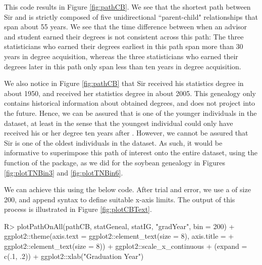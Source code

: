 \documentclass[article,shortnames]{jss}
\begin{document}
This code results in Figure \ref{fig:pathCB}. We see that the shortest path between Sir  and  is strictly composed of five unidirectional ``parent-child" relationships that span about 55 years. We see that the time difference between when an advisor and student earned their degrees is not consistent across this path: The three statisticians who earned their degrees earliest in this path span more than 30 years in degree acquisition, whereas the three statisticians who earned their degrees later in this path only span less than ten years in degree acquisition.

We also notice in Figure \ref{fig:pathCB} that Sir  received his statistics degree in about 1950, and  received her statistics degree in about 2005. This genealogy only contains historical information about obtained degrees, and does not project into the future. Hence, we can be assured that  is one of the younger individuals in the dataset, at least in the sense that the youngest individual could only have received his or her degree ten years after . However, we cannot be assured that Sir  is one of the oldest individuals in the dataset. As such, it would be informative to superimpose this path of interest onto the entire dataset, using the  function of the  package, as we did for the soybean genealogy in Figures \ref{fig:plotTNBin3} and \ref{fig:plotTNBin6}.

We can achieve this using the below code. After trial and error, we use a  of size 200, and append  syntax to define suitable x-axis limits. The output of this process is illustrated in Figure \ref{fig:plotCBText}.

\begin{CodeChunk}
\begin{CodeInput}
R> plotPathOnAll(pathCB, statGeneal, statIG, "gradYear", bin = 200)
+    ggplot2::theme(axis.text = ggplot2::element_text(size = 8), axis.title =
+    ggplot2::element_text(size = 8)) + ggplot2::scale_x_continuous
+    (expand = c(.1, .2)) + ggplot2::xlab("Graduation Year")
\end{CodeInput}
\end{CodeChunk}
\end{document}
